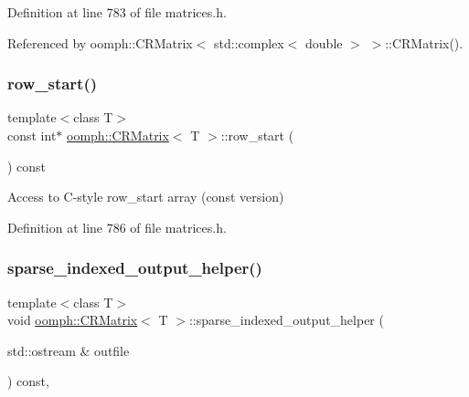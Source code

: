 Definition at line 783 of file matrices.\+h.



Referenced by oomph\+::\+C\+R\+Matrix$<$ std\+::complex$<$ double $>$ $>$\+::\+C\+R\+Matrix().

\mbox{\label{classoomph_1_1CRMatrix_a28d1d96e2259b0a3a8a4f8e4fb312947}} 
\subsubsection{\texorpdfstring{row\+\_\+start()}{row\_start()}\hspace{0.1cm}{\footnotesize\ttfamily [2/2]}}
{\footnotesize\ttfamily template$<$class T$>$ \\
const int$\ast$ \hyperlink{classoomph_1_1CRMatrix}{oomph\+::\+C\+R\+Matrix}$<$ T $>$\+::row\+\_\+start (\begin{DoxyParamCaption}{ }\end{DoxyParamCaption}) const\hspace{0.3cm}{\ttfamily [inline]}}



Access to C-\/style row\+\_\+start array (const version) 



Definition at line 786 of file matrices.\+h.

\mbox{\label{classoomph_1_1CRMatrix_af34167172020d60e5fa382e4bd5d6466}} 
\subsubsection{\texorpdfstring{sparse\+\_\+indexed\+\_\+output\+\_\+helper()}{sparse\_indexed\_output\_helper()}}
{\footnotesize\ttfamily template$<$class T$>$ \\
void \hyperlink{classoomph_1_1CRMatrix}{oomph\+::\+C\+R\+Matrix}$<$ T $>$\+::sparse\+\_\+indexed\+\_\+output\+\_\+helper (\begin{DoxyParamCaption}\item[{std\+::ostream \&}]{outfile }\end{DoxyParamCaption}) const\hspace{0.3cm}{\ttfamily [inline]}, {\ttfamily [virtual]}}



